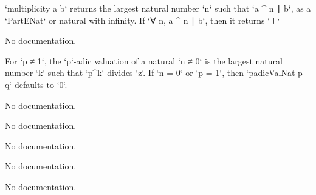 \begin{definition}\label{multiplicity'}
        \leanok
                `multiplicity a b` returns the largest natural number `n` such that
  `a ^ n ∣ b`, as a `PartENat` or natural with infinity. If `∀ n, a ^ n ∣ b`,
  then it returns `⊤`
    \end{definition}

\begin{theorem}\label{finite_nat_iff'}
                No documentation.
    \end{theorem}

\begin{definition}\label{padicValNat'}
        \leanok
                For `p ≠ 1`, the `p`-adic valuation of a natural `n ≠ 0` is the largest natural number `k` such
that `p^k` divides `z`. If `n = 0` or `p = 1`, then `padicValNat p q` defaults to `0`.
    \end{definition}

\begin{theorem}\label{finite_ideal_iff}
                No documentation.
    \end{theorem}

\begin{theorem}\label{ord_top}
                No documentation.
    \end{theorem}

\begin{definition}\label{Valuation.leIdeal}
                No documentation.
    \end{definition}

\begin{theorem}\label{Valuation.leIdeal_eq_top}
                No documentation.
    \end{theorem}

\begin{definition}\label{Valuation.ltIdeal}
                No documentation.
    \end{definition}

